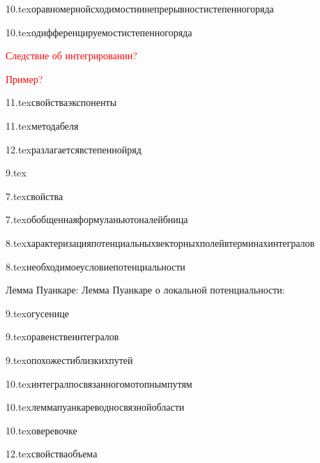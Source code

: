 {10.tex}{оравномернойсходимостиинепрерывностистепенногоряда}

{10.tex}{одифференцируемостистепенногоряда}

\textcolor{red}{Следствие об интегрировании?}

\textcolor{red}{Пример?}

{11.tex}{свойстваэкспоненты}

{11.tex}{методабеля}

{12.tex}{разлагаетсявстепеннойряд}

{9.tex}{}\?

{7.tex}{свойства}

{7.tex}{обобщеннаяформуланьютоналейбница}

{8.tex}{характеризацияпотенциальныхвекторныхполейвтерминахинтегралов}

{8.tex}{необходимоеусловиепотенциальности}

Лемма Пуанкаре:
Лемма Пуанкаре о локальной потенциальности:

{9.tex}{огусенице}

{9.tex}{оравенствеинтегралов}

{9.tex}{опохожестиблизкихпутей}

{10.tex}{интегралпосвязанногомотопнымпутям}

{10.tex}{леммапуанкареводносвязнойобласти}

{10.tex}{оверевочке}

{12.tex}{свойстваобъема}

